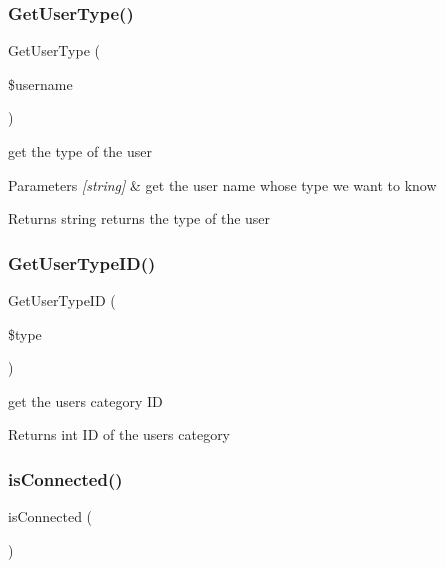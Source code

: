 \subsubsection{\texorpdfstring{Get\+User\+Type()}{GetUserType()}}
{\footnotesize\ttfamily Get\+User\+Type (\begin{DoxyParamCaption}\item[{}]{\$username }\end{DoxyParamCaption})}



get the type of the user 


\begin{DoxyParams}{Parameters}
{\em \mbox{[}string\mbox{]}} & get the user name whose type we want to know\\
\hline
\end{DoxyParams}
\begin{DoxyReturn}{Returns}
string returns the type of the user 
\end{DoxyReturn}
\mbox{\label{class_user_controller_a74b9734391971e98992763b6554225ac}} 
\subsubsection{\texorpdfstring{Get\+User\+Type\+I\+D()}{GetUserTypeID()}}
{\footnotesize\ttfamily Get\+User\+Type\+ID (\begin{DoxyParamCaption}\item[{}]{\$type }\end{DoxyParamCaption})}



get the user\textquotesingle{}s category ID 

\begin{DoxyReturn}{Returns}
int ID of the user\textquotesingle{}s category 
\end{DoxyReturn}
\mbox{\label{class_user_controller_af160f7fbbf281d018ae3162521b8267d}} 
\subsubsection{\texorpdfstring{is\+Connected()}{isConnected()}}
{\footnotesize\ttfamily is\+Connected (\begin{DoxyParamCaption}{ }\end{DoxyParamCaption})}



